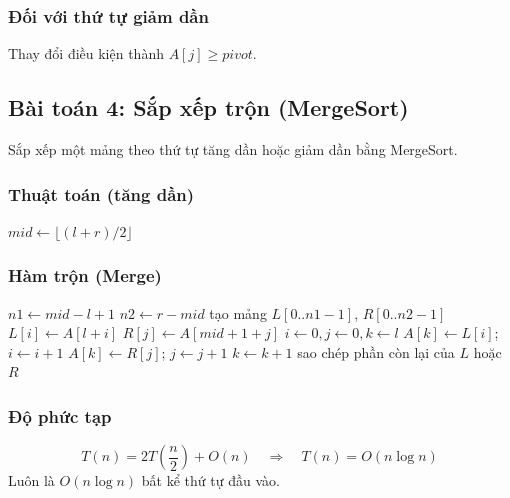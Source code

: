 \documentclass{article}
\begin{document}
\subsubsection{Đối với thứ tự giảm dần}
Thay đổi điều kiện thành \(A[j] \ge pivot\).

\subsection{Bài toán 4: Sắp xếp trộn (MergeSort)}

Sắp xếp một mảng theo thứ tự tăng dần hoặc giảm dần bằng MergeSort.

\subsubsection{Thuật toán (tăng dần)}

\begin{algorithmic}[1]
        \State $mid \gets \lfloor (l+r)/2 \rfloor$
        \State {}
        \State {}
        \State {}
    \EndIf
\EndFunction
\end{algorithmic}

\subsubsection{Hàm trộn (Merge)}

\begin{algorithmic}[1]
    \State $n1 \gets mid - l + 1$
    \State $n2 \gets r - mid$
    \State tạo mảng $L[0..n1-1]$, $R[0..n2-1]$
        \State $L[i] \gets A[l+i]$
    \EndFor
        \State $R[j] \gets A[mid+1+j]$
    \EndFor
    \State $i \gets 0, j \gets 0, k \gets l$
            \State $A[k] \gets L[i]$; $i \gets i+1$
        \Else
            \State $A[k] \gets R[j]$; $j \gets j+1$
        \EndIf
        \State $k \gets k+1$
    \EndWhile
    \State sao chép phần còn lại của $L$ hoặc $R$
\EndFunction
\end{algorithmic}

\subsubsection{Độ phức tạp}
\[
T(n) = 2T\left(\frac{n}{2}\right) + O(n) \quad\Rightarrow\quad T(n) = O(n \log n)
\]
Luôn là \(O(n \log n)\) bất kể thứ tự đầu vào.
\end{document}
